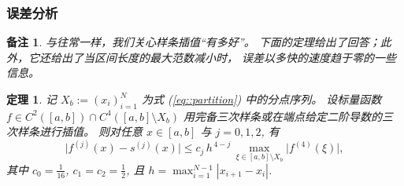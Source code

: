 \documentclass[a4paper]{ctexart}
\newtheorem{theorem}{定理}
\newtheorem{remark}{备注}
\numberwithin{theorem}{section}
\numberwithin{equation}{section}
\numberwithin{figure}{section}
\numberwithin{remark}{section}
\begin{document}
\subsubsection{误差分析}
\label{subsec::error_analysis}

\begin{remark}
    \label{rem::how_good_and_rate}
与往常一样，我们关心样条插值“有多好”。
下面的定理给出了回答；此外，它还给出了当区间长度的最大范数减小时，
误差以多快的速度趋于零的一些信息。
\end{remark}

\begin{theorem}
    \label{thm::error_rates_cubic}
记 $X_b:=(x_i)_{i=1}^{N}$ 为式 (\ref{eq::partition}) 中的分点序列。
设标量函数 $f\in C^{2}([a,b])\cap C^{4}([a,b]\setminus X_b)$ 
用完备三次样条或在端点给定二阶导数的三次样条进行插值。
则对任意 $x\in[a,b]$ 与 $j=0,1,2$, 有
\begin{equation}
    \label{eq::error_rate_main}
\bigl|f^{(j)}(x)-s^{(j)}(x)\bigr|\le c_j\,h^{\,4-j}\,
\max_{\xi\in[a,b]\setminus X_b}\bigl|f^{(4)}(\xi)\bigr|,
\end{equation}
其中 $c_0=\tfrac{1}{16}$, $c_1=c_2=\tfrac{1}{2}$, 且
$h=\max_{i=1}^{N-1}|x_{i+1}-x_i|$.
\end{theorem}
\end{document}

